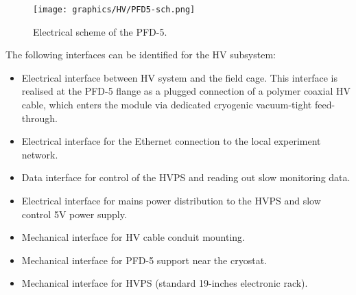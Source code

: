 \begin{figure}[htbp]
\centering 
\texttt{[image: graphics/HV/PFD5-sch.png]}
\caption{\label{fig:pfd5sch} Electrical scheme of the PFD-5.}
\end{figure}




The following interfaces can be identified for the HV subsystem:
    \begin{itemize}
        \item Electrical interface between HV system and the field cage. This interface is realised at the PFD-5 flange as a plugged connection of a polymer coaxial HV cable, which enters the module via dedicated cryogenic vacuum-tight feed-through.
        \item Electrical interface  for the Ethernet connection to the local experiment network.
        \item Data interface for control of the HVPS and reading out slow monitoring data.
        \item Electrical interface  for mains power distribution to the HVPS and slow control 5V power supply.
        \item Mechanical interface for HV cable conduit mounting.
        \item Mechanical interface for PFD-5 support near the cryostat.
        \item Mechanical interface for HVPS (standard 19-inches electronic rack).
    \end{itemize}

